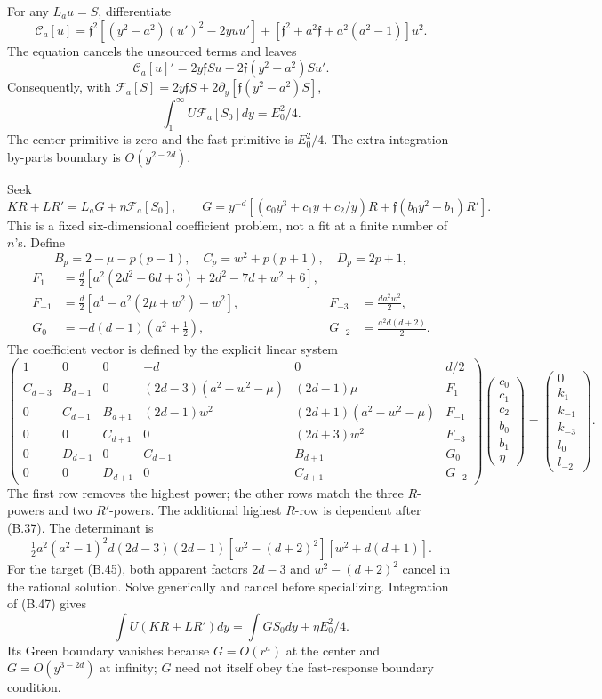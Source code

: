 \documentclass[a4paper,11pt]{article}
\numberwithin{equation}{section}
\begin{document}
For any \(L_au=S\), differentiate \[
\mathscr C_a[u]
=\mathfrak f^2[(y^2-a^2)(u')^2-2yuu']
+[\mathfrak f^2+a^2\mathfrak f+a^2(a^2-1)]u^2 .
\] The equation cancels the unsourced terms and leaves \[
\mathscr C_a[u]'
=2y\mathfrak f Su-2\mathfrak f(y^2-a^2)Su'.
\] Consequently, with \(\mathscr F_a[S]=2y\mathfrak f S+ 2\partial_y[\mathfrak f(y^2-a^2)S]\), \[
\int_1^\infty U\mathscr F_a[S_0]dy=E_0^2/4.
\tag{B.46}
\] The center primitive is zero and the fast primitive is \(E_0^2/4\). The extra integration-by-parts boundary is \(O(y^{2-2d})\).

Seek \[
KR+LR'=L_aG+\eta\mathscr F_a[S_0],\qquad
G=y^{-d}[(c_0y^3+c_1y+c_2/y)R
+\mathfrak f(b_0y^2+b_1)R'] .
\tag{B.47}
\] This is a fixed six-dimensional coefficient problem, not a fit at a finite number of \(n\)'s. Define \[
B_p=2-\mu-p(p-1),\quad C_p=w^2+p(p+1),\quad D_p=2p+1,
\] \[
\begin{aligned}
F_1&=\frac d2[a^2(2d^2-6d+3)+2d^2-7d+w^2+6],\\
F_{-1}&=\frac d2[a^4-a^2(2\mu+w^2)-w^2],
&F_{-3}&=\frac{da^2w^2}{2},\\
G_0&=-d(d-1)(a^2+\tfrac12),
&G_{-2}&=\frac{a^2d(d+2)}2 .
\end{aligned}
\] The coefficient vector is defined by the explicit linear system \begingroup
\setlength{\arraycolsep}{3.8pt}
\[
\begin{pmatrix}
1&0&0&-d&0&d/2\\
C_{d-3}&B_{d-1}&0&(2d-3)(a^2-w^2-\mu)&(2d-1)\mu&F_1\\
0&C_{d-1}&B_{d+1}&(2d-1)w^2&(2d+1)(a^2-w^2-\mu)&F_{-1}\\
0&0&C_{d+1}&0&(2d+3)w^2&F_{-3}\\
0&D_{d-1}&0&C_{d-1}&B_{d+1}&G_0\\
0&0&D_{d+1}&0&C_{d+1}&G_{-2}
\end{pmatrix}
\begin{pmatrix}c_0\\c_1\\c_2\\b_0\\b_1\\\eta\end{pmatrix}
=\begin{pmatrix}0\\k_1\\k_{-1}\\k_{-3}\\l_0\\l_{-2}\end{pmatrix}.
\tag{B.48}
\]
\endgroup The first row removes the highest power; the other rows match the three \(R\)-powers and two \(R'\)-powers. The additional highest \(R\)-row is dependent after (B.37). The determinant is \[
\tfrac12a^2(a^2-1)^2d(2d-3)(2d-1)
[w^2-(d+2)^2][w^2+d(d+1)] .
\] For the target (B.45), both apparent factors \(2d-3\) and \(w^2-(d+2)^2\) cancel in the rational solution. Solve generically and cancel before specializing. Integration of (B.47) gives \[
\int U(KR+LR')dy=\int GS_0dy+\eta E_0^2/4 .
\tag{B.49}
\] Its Green boundary vanishes because \(G=O(r^a)\) at the center and \(G=O(y^{3-2d})\) at infinity; \(G\) need not itself obey the fast-response boundary condition.
\end{document}
